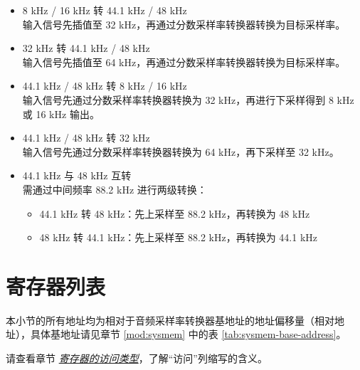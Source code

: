 \documentclass[main\_\_CN.tex]{subfiles}
\begin{document}
\begin{itemize}
  \item 8 kHz / 16 kHz 转 44.1 kHz / 48 kHz \\
  输入信号先插值至 32 kHz，再通过分数采样率转换器转换为目标采样率。

  \item 32 kHz 转 44.1 kHz / 48 kHz \\
  输入信号先插值至 64 kHz，再通过分数采样率转换器转换为目标采样率。

  \item 44.1 kHz / 48 kHz 转 8 kHz / 16 kHz \\
  输入信号先通过分数采样率转换器转换为 32 kHz，再进行下采样得到 8 kHz 或 16 kHz 输出。

  \item 44.1 kHz / 48 kHz 转 32 kHz \\
  输入信号先通过分数采样率转换器转换为 64 kHz，再下采样至 32 kHz。

  \item 44.1 kHz 与 48 kHz 互转 \\
  需通过中间频率 88.2 kHz 进行两级转换：
  \begin{itemize}
    \item 44.1 kHz 转 48 kHz：先上采样至 88.2 kHz，再转换为 48 kHz
    \item 48 kHz 转 44.1 kHz：先上采样至 88.2 kHz，再转换为 44.1 kHz
  \end{itemize}
\end{itemize}





\newpage
\hypertarget{asrc-reg-summ}{}
\section{寄存器列表}
\label{sec:asrc-reg-summ}

本小节的所有地址均为相对于音频采样率转换器基地址的地址偏移量（相对地址），具体基地址请见章节 \ref{mod:sysmem} \textit{} 中的表 \ref{tab:sysmem-base-address}。

请查看章节 \hyperref[glossary-access-types]{\textit{寄存器的访问类型}}，了解“访问”列缩写的含义。



\end{document}

